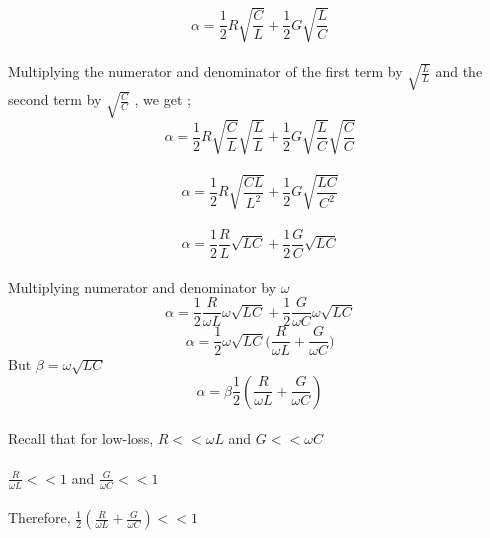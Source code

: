 	\begin{equation*}
	\alpha =\frac{1}{2}R\sqrt{\frac{C}{L}} + \frac{1}{2}G\sqrt{\frac{L}{C}}	\end{equation*}\\
	Multiplying the numerator and denominator of the first term by $\sqrt{\frac{L}{L}}$ and the second term by $\sqrt{\frac{C}{C}}$ , we get ;\\
	
	\begin{equation*}
	\alpha = \frac{1}{2} R \sqrt{\frac{C}{L}} \sqrt{\frac{L}{L}} + \frac{1}{2} G \sqrt{\frac{L}{C}} \sqrt{\frac{C}{C}} 
	\end{equation*}\\
	\begin{equation*}
	\alpha =  \frac{1}{2} R \sqrt{\frac{CL}{L^2}} + \frac{1}{2} G \sqrt{\frac{LC}{C^2}}	
	\end{equation*}\\
	\begin{equation*}
	\alpha = \frac{1}{2} \frac{R}{L} \sqrt{LC} + \frac{1}{2} \frac{G}{C} \sqrt{LC}
	\end{equation*}\\
	Multiplying numerator and denominator by $\omega$\\
	\begin{equation*}
	\alpha = \frac{1}{2} \frac{R}{\omega L} \omega \sqrt{LC} + \frac{1}{2} \frac{G}{\omega C} \omega \sqrt{LC}
	\end{equation*}
	\begin{equation*}
	\alpha = \frac{1}{2} \omega\sqrt{LC}{(\frac{R}{\omega L} + \frac{G}{\omega C}})
	\end{equation*}
	But $\beta = \omega \sqrt{LC}$\\
	\begin{equation}
	\alpha = \beta\frac{1}{2} ( \frac{R}{\omega L} + \frac{G}{\omega C})
	\end{equation}
	\\	Recall that for low-loss, $R << \omega L$ and $G << \omega C$\\
	\\$\frac{R}{\omega L} << 1$ and $\frac{G}{\omega C} << 1$\\
	\\Therefore,  $\frac{1}{2} (\frac{R}{\omega L} + \frac{G}{\omega C}) << 1$\\
	
